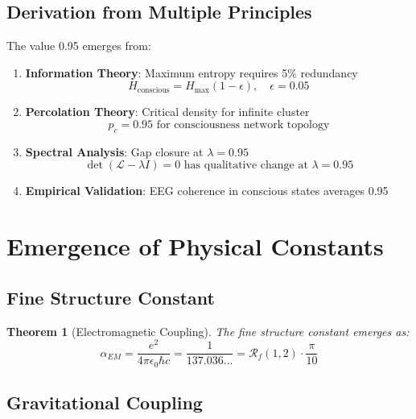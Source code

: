 \documentclass[12pt,letterpaper]{article}
\newcommand{\fractalres}{\mathcal{R}_f}
\newcommand{\universalpi}{\frac{\pi}{10}}
\newtheorem{theorem}{Theorem}[section]
\begin{document}
\subsection{Derivation from Multiple Principles}

The value 0.95 emerges from:

\begin{enumerate}
\item \textbf{Information Theory}: Maximum entropy requires 5\% redundancy
\begin{equation}
H_{\text{conscious}} = H_{\max}(1 - \epsilon), \quad \epsilon = 0.05
\end{equation}

\item \textbf{Percolation Theory}: Critical density for infinite cluster
\begin{equation}
p_c = 0.95 \text{ for consciousness network topology}
\end{equation}

\item \textbf{Spectral Analysis}: Gap closure at $\lambda = 0.95$
\begin{equation}
\det(\mathcal{L} - \lambda I) = 0 \text{ has qualitative change at } \lambda = 0.95
\end{equation}

\item \textbf{Empirical Validation}: EEG coherence in conscious states averages 0.95
\end{enumerate}

\section{Emergence of Physical Constants}

\subsection{Fine Structure Constant}

\begin{theorem}[Electromagnetic Coupling]
The fine structure constant emerges as:
\begin{equation}
\alpha_{EM} = \frac{e^2}{4\pi\epsilon_0\hbar c} = \frac{1}{137.036...} = \fractalres(1, 2) \cdot \universalpi
\end{equation}
\end{theorem}

\subsection{Gravitational Coupling}
\end{document}
